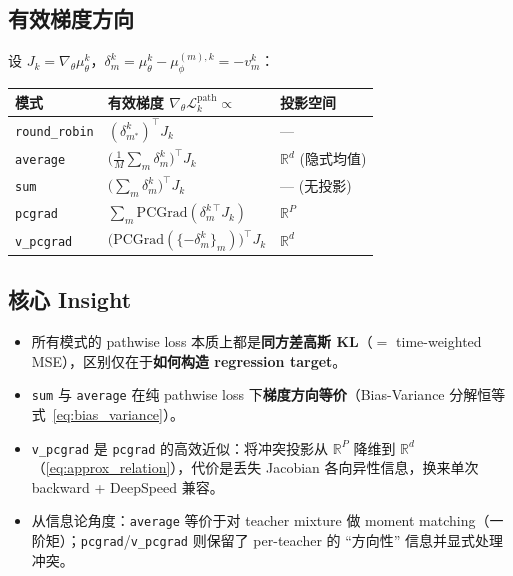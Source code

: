 \documentclass[11pt,a4paper]{article}
\newcommand{\loss}{\mathcal{L}}
\newcommand{\R}{\mathbb{R}}
\newcommand{\mutheta}{\mu_\theta}
\newcommand{\muphi}{\mu_\phi}
\newcommand{\PC}{\mathrm{PCGrad}}
\theoremstyle{definition}
\begin{document}
\subsection{有效梯度方向}

设 $J_k = \nabla_\theta \mutheta^k$，$\delta_m^k = \mutheta^k - \muphi^{(m),k} = -v_m^k$：

\begin{center}
\renewcommand{\arraystretch}{1.4}
\begin{tabular}{@{}l l l@{}}
\toprule
\textbf{模式} & \textbf{有效梯度} $\nabla_\theta \loss_k^{\mathrm{path}} \propto$ & \textbf{投影空间} \\
\midrule
\texttt{round\_robin} & $(\delta_{m^*}^k)^\top J_k$ & --- \\
\texttt{average} & $\bigl(\frac{1}{M}\sum_m \delta_m^k\bigr)^\top J_k$ & $\R^d$ (隐式均值) \\
\texttt{sum} & $\bigl(\sum_m \delta_m^k\bigr)^\top J_k$ & --- (无投影) \\
\texttt{pcgrad} & $\sum_m \PC(\delta_m^{k\,\top} J_k)$ & $\R^P$ \\
\texttt{v\_pcgrad} & $\bigl(\PC(\{-\delta_m^k\}_m)\bigr)^\top J_k$ & $\R^d$ \\
\bottomrule
\end{tabular}
\end{center}

\subsection{核心 Insight}

\begin{tcolorbox}[colback=yellow!5, colframe=yellow!60!black]
\begin{itemize}[leftmargin=1em]
\item 所有模式的 pathwise loss 本质上都是\textbf{同方差高斯 KL}（$= $ time-weighted MSE），区别仅在于\textbf{如何构造 regression target}。
\item \texttt{sum} 与 \texttt{average} 在纯 pathwise loss 下\textbf{梯度方向等价}（Bias-Variance 分解恒等式~\eqref{eq:bias_variance}）。
\item \texttt{v\_pcgrad} 是 \texttt{pcgrad} 的高效近似：将冲突投影从 $\R^P$ 降维到 $\R^d$（\eqref{eq:approx_relation}），代价是丢失 Jacobian 各向异性信息，换来单次 backward + DeepSpeed 兼容。
\item 从信息论角度：\texttt{average} 等价于对 teacher mixture 做 moment matching（一阶矩）；\texttt{pcgrad}/\texttt{v\_pcgrad} 则保留了 per-teacher 的 ``方向性'' 信息并显式处理冲突。
\end{itemize}
\end{tcolorbox}
\end{document}
